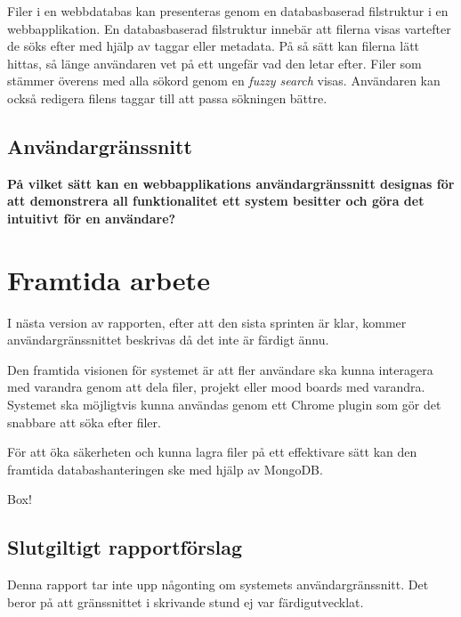 Filer i en webbdatabas kan presenteras genom en databasbaserad filstruktur i en
webbapplikation. En databasbaserad filstruktur innebär att filerna visas
vartefter de söks efter med hjälp av taggar eller metadata. På så sätt kan
filerna lätt hittas, så länge användaren vet på ett ungefär vad den letar efter.
Filer som stämmer överens med alla sökord genom en \emph{fuzzy search} visas.
Användaren kan också redigera filens taggar till att passa sökningen bättre.

\subsection{Användargränssnitt}

\textbf{På vilket sätt kan en webbapplikations användargränssnitt designas för
att demonstrera all funktionalitet ett system besitter och göra det intuitivt
för en användare?}

\section{Framtida arbete}

I nästa version av rapporten, efter att den sista sprinten är klar, kommer
användargränssnittet beskrivas då det inte är färdigt ännu.

Den framtida visionen för systemet är att fler användare ska kunna interagera
med varandra genom att dela filer, projekt eller mood boards med varandra.
Systemet ska möjligtvis kunna användas genom ett Chrome plugin som gör det
snabbare att söka efter filer.

För att öka säkerheten och kunna lagra filer på ett effektivare sätt kan den
framtida databashanteringen ske med hjälp av MongoDB.

Box!

\subsection{Slutgiltigt rapportförslag}
Denna rapport tar inte upp någonting om systemets användargränssnitt. Det beror
på att gränssnittet i skrivande stund ej var färdigutvecklat.
